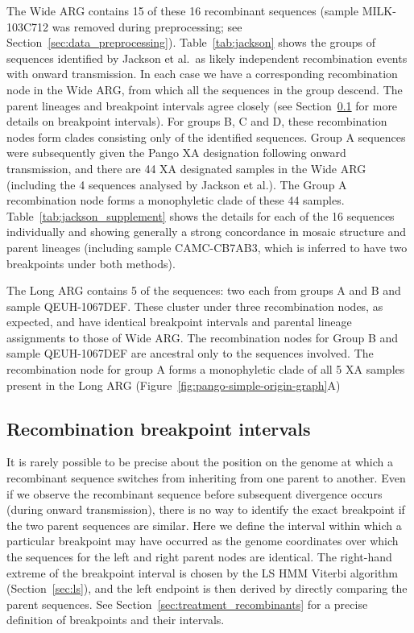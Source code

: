 \documentclass{article}
\begin{document}
The Wide ARG contains 15 of these 16 recombinant sequences
(sample MILK-103C712 was removed during preprocessing; see
Section~\ref{sec:data_preprocessing}).
Table~\ref{tab:jackson} shows the groups of sequences identified by Jackson
et al.\ as likely independent recombination events with onward transmission.
In each case we have a corresponding recombination node in the Wide ARG,
from which all the sequences in the group descend. The parent lineages
and breakpoint intervals agree closely (see
Section~\ref{sec:breakpoint_intervals} for more details on breakpoint
intervals).
For groups B, C and D,
these recombination nodes form clades consisting only of the identified
sequences.
Group A sequences were subsequently given the Pango XA designation
following onward transmission,
and there are 44 XA designated samples in the Wide ARG (including the
4 sequences analysed by Jackson et al.). The Group A recombination
node forms a monophyletic clade of these 44 samples.
Table~\ref{tab:jackson_supplement} shows the details for each of the
16 sequences individually and showing generally a strong concordance
in mosaic structure and parent lineages
(including sample CAMC-CB7AB3, which is inferred to have two breakpoints under both
methods).

The Long ARG contains 5 of the sequences: two each from groups A and B
and sample QEUH-1067DEF. These cluster under three recombination nodes, as expected,
and have identical breakpoint intervals and parental lineage assignments
to those of Wide ARG.
The recombination nodes for Group B and sample QEUH-1067DEF are ancestral only
to the sequences involved.
The recombination node for group A forms a monophyletic clade of all
5 XA samples present in the Long ARG
(Figure~\ref{fig:pango-simple-origin-graph}A)

\subsection{Recombination breakpoint intervals}
\label{sec:breakpoint_intervals}
It is rarely possible to be precise about the position on the genome at which
a recombinant sequence switches from inheriting from one parent to another.
Even if we observe the recombinant sequence before subsequent
divergence occurs (during onward transmission), there is no way to identify the exact breakpoint if the two parent sequences
are similar.
Here we define the
interval within which a particular breakpoint may have occurred
as the genome coordinates over which the
sequences for the left and right parent nodes are identical. The right-hand
extreme of the breakpoint interval is chosen by the LS HMM Viterbi algorithm
(Section~\ref{sec:ls}), and the left endpoint is then derived by directly
comparing the parent sequences. See Section~\ref{sec:treatment_recombinants} for
a precise definition of breakpoints and their intervals.
\end{document}
